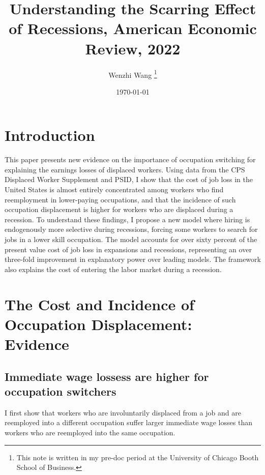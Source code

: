 \documentclass[12pt]{article}
\theoremstyle{definition}
\begin{document}
 


\title{\bf Understanding the Scarring Effect of Recessions, American Economic Review, 2022} 
\author{Wenzhi Wang \thanks{This note is written in my pre-doc period at the University of Chicago Booth School of Business.} } 
\date{\today} 
\maketitle 

\citet{huckfeldtUnderstandingScarringEffect2022}

\section{Introduction}

This paper presents new evidence on the importance of occupation switching for explaining the earnings losses of displaced workers. Using data from the CPS Displaced Worker Supplement and PSID, I show that the cost of job loss in the United States is almost entirely concentrated among workers who find reemployment in lower-paying occupations, and that the incidence of such occupation displacement is higher for workers who are displaced during a recession. To understand these findings, I propose a new model where hiring is endogenously more selective during recessions, forcing some workers to search for jobs in a lower skill occupation. The model accounts for over sixty percent of the present value cost of job loss in expansions and recessions, representing an over three-fold improvement in explanatory power over leading models. The framework also explains the cost of entering the labor market during a recession. 

\section{The Cost and Incidence of Occupation Displacement: Evidence}

\subsection{Immediate wage lossess are higher for occupation switchers}

I first show that workers who are involuntarily displaced from a job and are reemployed into a different occupation suffer larger immediate wage losses than workers who are reemployed into the same occupation.
\end{document}
